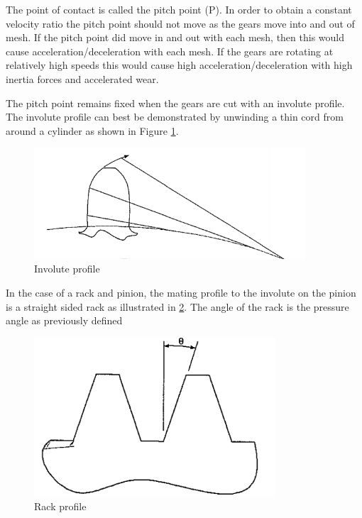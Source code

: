The point of contact is called the pitch point (P). In order to obtain a constant velocity ratio the pitch point should not move as the gears move into and out of mesh. If the pitch point did move in and out with each mesh, then this would cause acceleration/deceleration with each mesh. If the gears are rotating at relatively high speeds this would cause high acceleration/deceleration with high inertia forces and accelerated wear.

The pitch point remains fixed when the gears are cut with an involute profile. The involute profile can best be demonstrated by unwinding a thin cord from around a cylinder as shown in Figure \ref{fig-4}.

\begin{figure}[h!]
  \center
  \includegraphics[width=0.9\textwidth]{figs/fig4.png}
  \caption{Involute profile}
  \label{fig-4}
\end{figure}

In the case of a rack and pinion, the mating profile to the involute on the pinion is a straight sided rack as illustrated in \cref{fig-5}. The angle of the rack is the pressure angle as previously defined

\begin{figure}[h!]
  \center
  \includegraphics[width=0.8\textwidth]{figs/fig5.png}
  \caption{Rack profile}
  \label{fig-5}
\end{figure}

